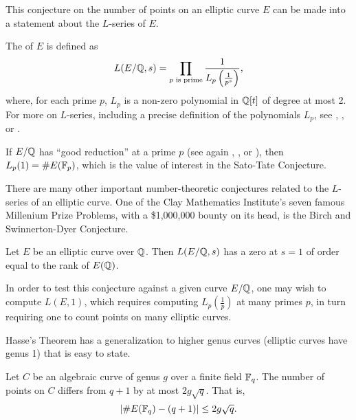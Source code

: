 This conjecture on the number of points on an elliptic curve $E$
can be made into a statement about the $L$-series of $E$.
\begin{comment}
The $L$-series of curves are central to many conjectures in number theory.
A complete discussion of $L$-series is outside the scope of this thesis;
we present only enough to motivate the topic of this thesis.
Let $E$ be an elliptic curve defined over the rational numbers $\bb Q$,
meaning $E$ is defined by a polynomial in $\bb Q[x,y]$ of the form of Equation \ref{eq_elliptic}.
\end{comment}
The  of $E$ is defined as
\[ L(E/\mathbb{Q}, s)  = \prod_{p \text{ is prime}} \frac 1 {L_p \left( \frac 1 {p^s} \right)},\]
where, for each prime $p$, $L_p$ is a non-zero polynomial in $\mathbb{Q}[t]$ of degree at most 2.
For more on $L$-series, including a precise definition of the polynomials $L_p$,
see \cite{husemoller87}, \cite{milne06}, or \cite{silverman09}.

If $E/\mathbb{Q}$ has ``good reduction'' at a prime $p$
(see again \cite{husemoller87}, \cite{milne06}, or \cite{silverman09}),
then $L_p(1) = \#E(\mathbb{F}_p)$, which is the value of interest in the Sato-Tate Conjecture.

There are many other important number-theoretic conjectures related to the $L$-series of an elliptic curve.
One of the Clay Mathematics Institute's seven famous Millenium Prize Problems,
with a \$1,000,000 bounty on its head,
is the Birch and Swinnerton-Dyer Conjecture.

\begin{conjecture}
  Let $E$ be an elliptic curve over $\mathbb{Q}$.
  Then $L(E/\mathbb{Q}, s)$ has a zero at $s = 1$ of order equal to the rank of $E(\mathbb{Q})$.
\end{conjecture}

In order to test this conjecture against a given curve $E/\mathbb{Q}$,
one may wish to compute $L(E, 1)$, which requires computing $L_p(\frac 1 p)$ at many primes $p$,
in turn requiring one to count points on many elliptic curves.

Hasse's Theorem has a generalization to higher genus curves
(elliptic curves have genus 1) that is easy to state.
\begin{theorem}
  \label{thm_hasse_weil}
  Let $C$ be an algebraic curve of genus $g$ over a finite field $\mathbb{F}_q$.
  The number of points on $C$ differs from $q + 1$ by at most $2g \sqrt q$.
  That is,
  \[ | \#E(\mathbb{F}_q) - (q + 1) | \leq 2g \sqrt q. \]
\end{theorem}

